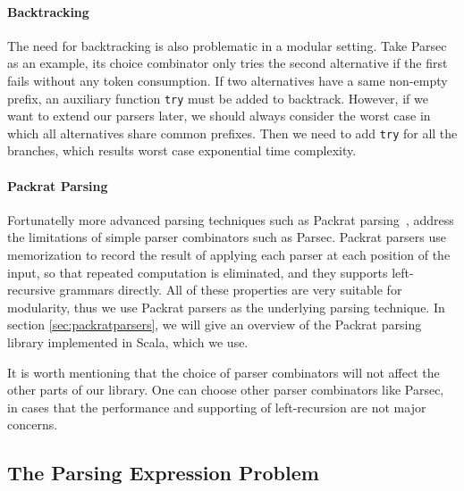 \paragraph{Backtracking} The need for backtracking is also problematic
in a modular setting. Take Parsec as an example, its choice
combinator only tries the second alternative if the first fails
without any token consumption. If two alternatives have a same
non-empty prefix, an auxiliary function \lstinline{try} must be added
to backtrack. However, if we want to extend our parsers later, we
should always consider the worst case in which all alternatives share
common prefixes. Then we need to add \lstinline{try} for all the
branches, which results worst case exponential time complexity.

\paragraph{Packrat Parsing}
Fortunatelly more advanced parsing techniques such as Packrat
parsing~\cite{}, address the limitations of simple parser combinators
such as Parsec. Packrat parsers use
memorization to record the result of applying each parser at each
position of the input, so that repeated computation is eliminated, and
they supports left-recursive grammars directly. All of these properties are very
suitable for modularity, thus we use Packrat parsers as the underlying
parsing technique. In section \ref{sec:packratparsers}, we will give
an overview of the Packrat parsing library implemented in Scala,
which we use.

It is worth mentioning that the choice of parser combinators will not
affect the other parts of our library. One can choose other parser
combinators like Parsec, in cases that the performance and supporting
of left-recursion are not major concerns.

\subsection{The Parsing Expression Problem}

